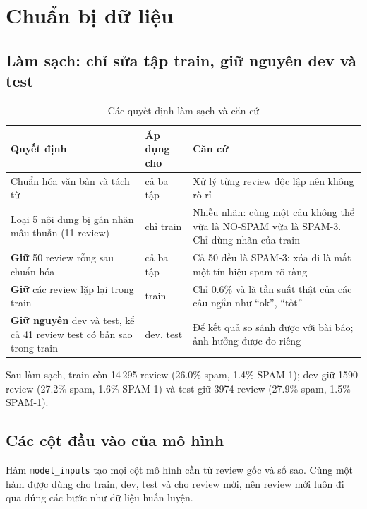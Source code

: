 \section{Chuẩn bị dữ liệu}
\label{sec:text-prep}

\subsection{Làm sạch: chỉ sửa tập train, giữ nguyên dev và test}

\begin{table}[H]
\centering
\caption{Các quyết định làm sạch và căn cứ}
\label{tab:text-cleaning}
\small
\begin{tabular}{>{\raggedright\arraybackslash}p{5.0cm}>{\raggedright\arraybackslash}p{2.0cm}>{\raggedright\arraybackslash}p{7.4cm}}
\toprule
Quyết định & Áp dụng cho & Căn cứ\\
\midrule
Chuẩn hóa văn bản và tách từ & cả ba tập & Xử lý từng review độc lập nên không rò rỉ\\
Loại 5 nội dung bị gán nhãn mâu thuẫn (11 review) & chỉ train & Nhiễu nhãn: cùng một câu không thể vừa là NO-SPAM vừa là SPAM-3. Chỉ dùng nhãn của train\\
\textbf{Giữ} 50 review rỗng sau chuẩn hóa & cả ba tập & Cả 50 đều là SPAM-3: xóa đi là mất một tín hiệu spam rõ ràng\\
\textbf{Giữ} các review lặp lại trong train & train & Chỉ 0.6\% và là tần suất thật của các câu ngắn như ``ok'', ``tốt''\\
\textbf{Giữ nguyên} dev và test, kể cả 41 review test có bản sao trong train & dev, test & Để kết quả so sánh được với bài báo; ảnh hưởng được đo riêng\\
\bottomrule
\end{tabular}
\end{table}

Sau làm sạch, train còn 14\,295 review (26.0\% spam, 1.4\% SPAM-1); dev giữ 1590 review (27.2\% spam, 1.6\% SPAM-1) và test giữ 3974 review (27.9\% spam, 1.5\% SPAM-1).

\subsection{Các cột đầu vào của mô hình}
\label{sec:text-inputs}
Hàm \texttt{model\_inputs} tạo mọi cột mô hình cần từ review gốc và số sao. Cùng một hàm được dùng cho train, dev, test và cho review mới,
nên review mới luôn đi qua đúng các bước như dữ liệu huấn luyện.

